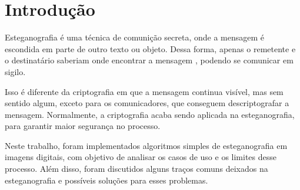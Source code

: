 \section{Introdução}

Esteganografia é uma técnica de comunição secreta, onde a mensagem é escondida em parte de outro texto ou objeto. Dessa forma, apenas o remetente e o destinatário saberiam onde encontrar a mensagem , podendo se comunicar em sigilo.


Isso é diferente da criptografia em que a mensagem continua visível, mas sem sentido algum, exceto para os comunicadores, que conseguem descriptografar a mensagem. Normalmente, a criptografia acaba sendo aplicada na esteganografia, para garantir maior segurança no processo.

Neste trabalho, foram implementados algoritmos simples de esteganografia em imagens digitais, com objetivo de analisar os casos de uso e os limites desse processo. Além disso, foram discutidos alguns traços comuns deixados na esteganografia e possíveis soluções para esses problemas. %
